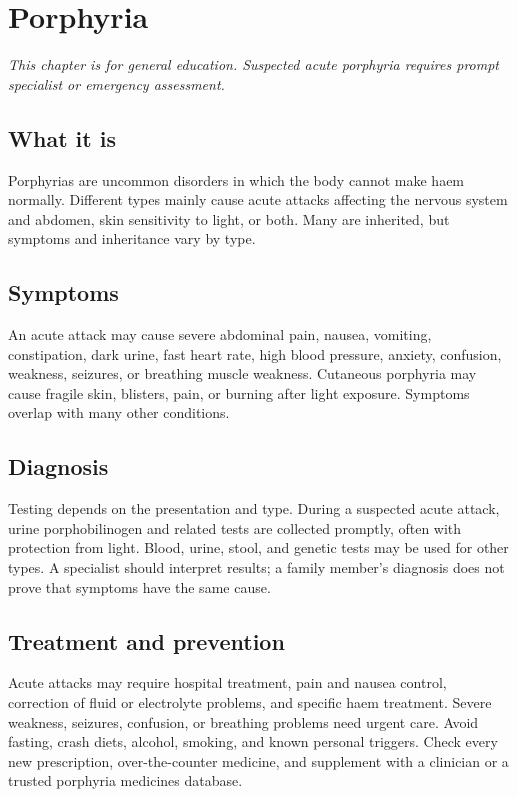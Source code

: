 \chapter{Porphyria}

\medskip
\noindent\textit{This chapter is for general education. Suspected acute porphyria requires prompt specialist or emergency assessment.}

\section*{What it is}
Porphyrias are uncommon disorders in which the body cannot make haem normally. Different types mainly cause acute attacks affecting the nervous system and abdomen, skin sensitivity to light, or both. Many are inherited, but symptoms and inheritance vary by type.

\section*{Symptoms}
An acute attack may cause severe abdominal pain, nausea, vomiting, constipation, dark urine, fast heart rate, high blood pressure, anxiety, confusion, weakness, seizures, or breathing muscle weakness. Cutaneous porphyria may cause fragile skin, blisters, pain, or burning after light exposure. Symptoms overlap with many other conditions.

\section*{Diagnosis}
Testing depends on the presentation and type. During a suspected acute attack, urine porphobilinogen and related tests are collected promptly, often with protection from light. Blood, urine, stool, and genetic tests may be used for other types. A specialist should interpret results; a family member’s diagnosis does not prove that symptoms have the same cause.

\section*{Treatment and prevention}
Acute attacks may require hospital treatment, pain and nausea control, correction of fluid or electrolyte problems, and specific haem treatment. Severe weakness, seizures, confusion, or breathing problems need urgent care. Avoid fasting, crash diets, alcohol, smoking, and known personal triggers. Check every new prescription, over-the-counter medicine, and supplement with a clinician or a trusted porphyria medicines database.

